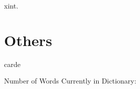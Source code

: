 \begin{multicols*}{2}
\begin{description}[leftmargin=*]
    \begin{dictentry}{x}{int.}
    \end{dictentry}
\end{description}

\section{Others}

\begin{description}[leftmargin=*]
    \begin{dictentry}{carde}{}
    \end{dictentry}
\end{description}

\end{multicols*}
\vspace{\fill}
Number of Words Currently in Dictionary: \thedictwordcount